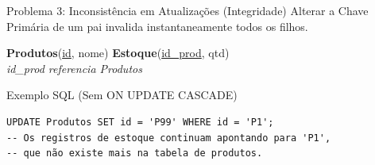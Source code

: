 \documentclass[9pt]{beamer}
\begin{document}
\begin{frame}[fragile]{Problema 3: Inconsistência em Atualizações (Integridade)}
  \small
  Alterar a Chave Primária de um pai invalida instantaneamente todos os filhos.
  \vspace{0.2cm}
  \centering
  \centering\scriptsize
  \textbf{Produtos}(\underline{id}, nome) \quad \textbf{Estoque}(\underline{id\_prod}, qtd) \\
  \textit{id\_prod referencia Produtos}
  \vspace{0.1cm}
  \begin{exampleblock}{Exemplo SQL (Sem ON UPDATE CASCADE)}
\begin{lstlisting}
UPDATE Produtos SET id = 'P99' WHERE id = 'P1';
-- Os registros de estoque continuam apontando para 'P1',
-- que não existe mais na tabela de produtos.
\end{lstlisting}
  \end{exampleblock}
\end{frame}
\end{document}
